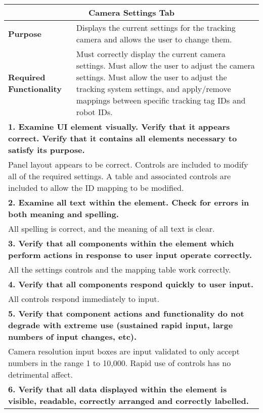 \begin{longtable}{ l p{10cm} }
 \hline
 \multicolumn{2}{c}{\textbf{Camera Settings Tab}}\\
 \hline
 \textbf{Purpose} & Displays the current settings for the tracking camera and allows the user to change them.\\
 \textbf{Required Functionality} & Must correctly display the current camera settings. Must allow the user to adjust the camera settings. Must allow the user to adjust the tracking system settings, and apply/remove mappings between specific tracking tag IDs and robot IDs.\\
 \hline
 \multicolumn{2}{p{14cm}}{\textbf{1. Examine UI element visually. Verify that it appears correct. Verify that it contains all elements necessary to satisfy its purpose.}}\\
 \multicolumn{2}{p{14cm}}{Panel layout appears to be correct. Controls are included to modify all of the required settings. A table and associated controls are included to allow the ID mapping to be modified.}\\
 \hline
 \multicolumn{2}{p{14cm}}{\textbf{2. Examine all text within the element. Check for errors in both meaning and spelling.}}\\
 \multicolumn{2}{p{14cm}}{All spelling is correct, and the meaning of all text is clear.}\\
 \hline
 \multicolumn{2}{p{14cm}}{\textbf{3. Verify that all components within the element which perform actions in response to user input operate correctly.}}\\
 \multicolumn{2}{p{14cm}}{All the settings controls and the mapping table work correctly.}\\
 \hline
 \multicolumn{2}{p{14cm}}{\textbf{4. Verify that all components respond quickly to user input.}}\\
 \multicolumn{2}{p{14cm}}{All controls respond immediately to input.}\\
 \hline
 \multicolumn{2}{p{14cm}}{\textbf{5. Verify that component actions and functionality do not degrade with extreme use (sustained rapid input, large numbers of input changes, etc).}}\\
 \multicolumn{2}{p{14cm}}{Camera resolution input boxes are input validated to only accept numbers in the range 1 to 10,000. Rapid use of controls has no detrimental affect.}\\
 \hline
 \multicolumn{2}{p{14cm}}{\textbf{6. Verify that all data displayed within the element is visible, readable, correctly arranged and correctly labelled.}}\\

\end{longtable}
